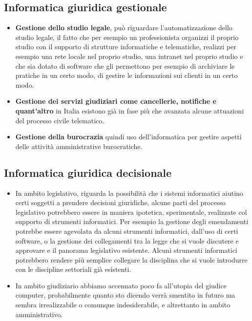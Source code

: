 \subsection{ Informatica giuridica gestionale}
\begin{itemize}
    \item \textbf{Gestione dello studio legale}, può riguardare l'automatizzazione dello studio legale, il fatto che per esempio un professionista organizzi il proprio studio con il supporto di strutture informatiche e telematiche, realizzi per esempio una rete locale nel proprio studio, una intranet nel proprio studio e che sia dotato di software che gli permettono per esempio di archiviare le pratiche in un certo modo, di gestire le informazioni sui clienti in un certo modo.
    \item \textbf{Gestione dei servizi giudiziari come cancellerie, notifiche e quant'altro} in Italia esistono già in fase più che avanzata alcune attuazioni del processo civile telematico.  
        \item \textbf{Gestione della burocrazia} quindi uso dell'informatica per gestire aspetti delle attività amministrative burocratiche.
\end{itemize}
\subsection{Informatica giuridica decisionale}
\begin{itemize}
    \item In ambito legislativo, riguarda la possibilità che i sistemi informatici aiutino certi soggetti a prendere decisioni giuridiche, alcune parti del processo legislativo potrebbero essere in maniera ipotetica, sperimentale, realizzate col supporto di strumenti informatici. Per esempio la gestione degli emendamenti potrebbe essere agevolata da alcuni strumenti informatici, dall'uso di certi software, o la gestione dei collegamenti tra la legge che si vuole discutere e approvare e il panorama legislativo esistente. Alcuni strumenti informatici potrebbero rendere più semplice collegare la disciplina che si vuole introdurre con le discipline settoriali già esistenti.  
    \item In ambito giudiziario abbiamo accennato poco fa all'utopia del giudice computer, probabilmente quanto sto dicendo verrà smentito in futuro ma sembra irrealizzabile o comunque indesiderabile, e altrettanto in ambito amministrativo.  
\end{itemize}


